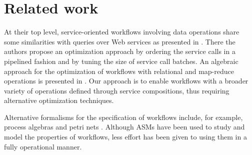 
\section{Related work} \label{sec:relatedWork}

At their top level, service-oriented workflows involving data operations share some similarities with queries over Web services as presented in \cite{Srivastava:2006:QOO:1182635.1164159}. There the authors propose an optimization approach by ordering the service calls in a pipelined fashion and by tuning the size of service call batches. An algebraic approach for the optimization of workflows with relational and map-reduce operations is presented in \cite{DBLP:journals/pvldb/OgasawaraOVDPM11}. Our approach is to enable workflows with a broader variety of operations defined through service compositions, thus requiring alternative optimization techniques.

Alternative formalisms for the specification of workflows include, for example, process algebras \cite{Curcin:2011:STW:2048456.2048467} and petri nets \cite{Hidders:2008:DDL:1340791.1340907}. Although ASMs have been used to study and model the properties of workflows, less effort has been given to using them in a fully operational manner.

